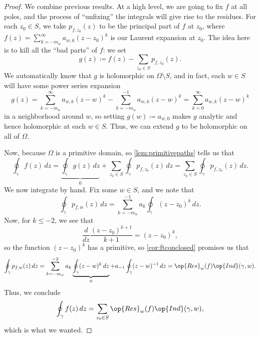 \documentclass[../notes.tex]{subfiles}
\begin{document}
\begin{proof}
	We combine previous results. At a high level, we are going to fix $f$ at all poles, and the process of ``unfixing'' the integrals will give rise to the residues. For each $z_0\in S$, we take $p_{f,z_0}(z)$ to be the principal part of $f$ at $z_0$, where
	$f(z)=\sum_{k=-m_w}^\infty a_{w,k}(z-z_0)^k$
	is our Laurent expansion at $z_0$. The idea here is to kill all the ``bad parts'' of $f$: we set
	\[g(z)\coloneqq f(z)-\sum_{z_0\in S}p_{f,z_0}(z).\]
	We automatically know that $g$ is holomorphic on $\Omega\setminus S$, and in fact, each $w\in S$ will have some power series expansion
	\[g(z)=\sum_{k=-m_w}^\infty a_{w,k}(z-w)^k-\sum_{k=-m_w}^{-1}a_{w,k}(z-w)^k=\sum_{k=0}^\infty a_{w,k}(z-w)^k\]
	in a neighborhood around $w$, so setting $g(w)\coloneqq a_{w,0}$ makes $g$ analytic and hence holomorphic at each $w\in S$. Thus, we can extend $g$ to be holomorphic on all of $\Omega$.

	Now, because $\Omega$ is a primitive domain, so \autoref{lem:primitivepaths} tells us that
	\[\oint_\gamma f(z)\,dz=\underbrace{\oint_\gamma g(z)\,dz}_0+\sum_{z_0\in S}\oint_\gamma p_{f,z_0}(z)\,dz=\sum_{z_0\in S}\oint_\gamma p_{f,z_0}(z)\,dz.\]
	We now integrate by hand. Fix some $w\in S$, and we note that
	\[\oint_\gamma p_{f,w}(z)\,dz=\sum_{k=-m_w}^{-1}a_k\oint_\gamma(z-z_0)^k\,dz.\]
	Now, for $k\le-2$, we see that
	\[\frac d{dz}\frac{(z-z_0)^{k+1}}{k+1}=(z-z_0)^k,\]
	so the function $(z-z_0)^k$ has a primitive, so \autoref{cor:ftconclosed} promises us that
	\[\oint_\gamma p_{f,w}(z)\,dz=\sum_{k=-m_w}^{-2}a_k\underbrace{\oint_\gamma(z-w)^k\,dz}_0+a_{-1}\oint_\gamma(z-w)^{-1}\,dz=\op{Res}_{w}(f)\op{Ind}(\gamma,w).\]
	Thus, we conclude
	\[\oint_\gamma f(z)\,dz=\sum_{z_0\in S}\op{Res}_{w}(f)\op{Ind}(\gamma,w),\]
	which is what we wanted.
\end{proof}
\end{document}
